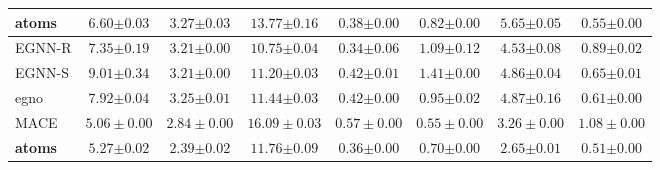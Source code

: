 \begin{table}[t]
{\begin{tabular}{lccccccc}
        \textbf{\gls{atoms}} & \(\mathbf{6.60}{\scriptstyle \pm0.03}\) & \(\mathbf{3.27}{\scriptstyle \pm0.03}\) & \(13.77{\scriptstyle \pm0.16}\) & \(\mathbf{0.38}{\scriptstyle \pm0.00}\) & \(\mathbf{0.82}{\scriptstyle \pm0.00}\) & \(\mathbf{5.65}{\scriptstyle \pm0.05}\) & \(\mathbf{0.55}{\scriptstyle \pm0.00}\) \\
        \midrule
        EGNN-R & \(7.35{\scriptstyle \pm0.19}\) & \(3.21{\scriptstyle \pm0.00}\) & \(\mathbf{10.75}{\scriptstyle \pm0.04}\) & \(\mathbf{0.34}{\scriptstyle \pm0.06}\) & \(1.09{\scriptstyle \pm0.12}\) & \(4.53{\scriptstyle \pm0.08}\) & \(0.89{\scriptstyle \pm0.02}\) \\
        EGNN-S & \(9.01{\scriptstyle \pm0.34}\) & \(3.21{\scriptstyle \pm0.00}\) & \(11.20{\scriptstyle \pm0.03}\) & \(0.42{\scriptstyle \pm0.01}\) & \(1.41{\scriptstyle \pm0.00}\) & \(4.86{\scriptstyle \pm0.04}\) & \(0.65{\scriptstyle \pm0.01}\) \\
        \gls{egno} & \(7.92{\scriptstyle \pm0.04}\) & \(3.25{\scriptstyle \pm0.01}\) & \(11.44{\scriptstyle \pm0.03}\) & \(0.42{\scriptstyle \pm0.00}\) & \(0.95{\scriptstyle \pm0.02}\) & \(4.87{\scriptstyle \pm0.16}\) & \(0.61{\scriptstyle \pm0.00}\) \\
         MACE & \(5.06\pm\scriptstyle{0.00}\) & \(2.84\pm\scriptstyle{0.00}\) & \(16.09\pm\scriptstyle{0.03}\) & \(0.57\pm\scriptstyle{0.00}\) & \(0.55\pm\scriptstyle{0.00}\) & \(3.26\pm\scriptstyle{0.00}\) & \(1.08\pm\scriptstyle{0.00}\) \\
        \textbf{\gls{atoms}} & \(\mathbf{5.27}{\scriptstyle \pm0.02}\) & \(\mathbf{2.39}{\scriptstyle \pm0.02}\) & \(11.76{\scriptstyle \pm0.09}\) & \(0.36{\scriptstyle \pm0.00}\) & \(\mathbf{0.70}{\scriptstyle \pm0.00}\) & \(\mathbf{2.65}{\scriptstyle \pm0.01}\) & \(\mathbf{0.51}{\scriptstyle \pm0.00}\) \\
        \bottomrule
    \end{tabular}
}
\end{table}




